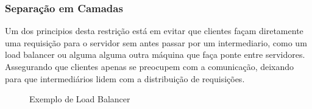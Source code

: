 \subsubsection[Separação em Camadas]{Separação em Camadas}

Um dos principios desta restrição está em evitar que clientes façam diretamente uma requisição para o servidor sem antes passar por um intermediario, como um load balancer ou alguma alguma outra máquina que faça ponte entre servidores. Assegurando que clientes apenas se preocupem com a comunicação, deixando para que intermediários lidem com a distribuição de requisições. \cite{Fielding2000}

\begin{figure}[h]
  \centering
  \caption{Exemplo de Load Balancer}
\end{figure}
